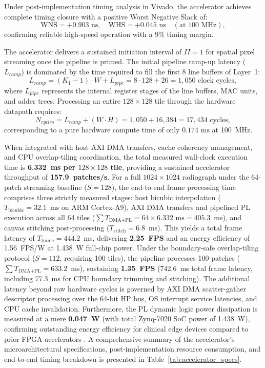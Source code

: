 \documentclass[conference]{IEEEtran}
\begin{document}
Under post-implementation timing analysis in Vivado, the accelerator achieves complete timing closure with a positive Worst Negative Slack of:
\begin{equation}
    \text{WNS} = +0.903\text{ ns}, \quad \text{WHS} = +0.045\text{ ns} \quad (\text{at } 100\text{ MHz}),
    \label{eq:wns}
\end{equation}
confirming reliable high-speed operation with a 9\% timing margin.

The accelerator delivers a sustained initiation interval of $II = 1$ for spatial pixel streaming once the pipeline is primed. The initial pipeline ramp-up latency ($L_{ramp}$) is dominated by the time required to fill the first 8 line buffers of Layer~1:
\begin{equation}
    L_{ramp} = (K_1 - 1) \cdot W + L_{pipe} = 8 \cdot 128 + 26 = 1,050\text{ clock cycles},
    \label{eq:ramp}
\end{equation}
where $L_{pipe}$ represents the internal register stages of the line buffers, MAC units, and adder trees. Processing an entire $128 \times 128$ tile through the hardware datapath requires:
\begin{equation}
    N_{cycles} = L_{ramp} + (W \cdot H) = 1,050 + 16,384 = 17,434\text{ cycles},
    \label{eq:total_cycles}
\end{equation}
corresponding to a pure hardware compute time of only $0.174\text{ ms}$ at 100~MHz. 

When integrated with host AXI DMA transfers, cache coherency management, and CPU overlap-tiling coordination, the total measured wall-clock execution time is \textbf{6.332~ms per $128 \times 128$ tile}, providing a sustained accelerator throughput of \textbf{157.9~patches/s}. For a full $1024 \times 1024$ radiograph under the 64-patch streaming baseline ($S = 128$), the end-to-end frame processing time comprises three strictly measured stages: host bicubic interpolation ($T_{\text{bicubic}} = 32.1$~ms on ARM Cortex-A9), AXI DMA transfers and pipelined PL execution across all 64 tiles ($\sum T_{\text{DMA+PL}} = 64 \times 6.332\text{~ms} = 405.3$~ms), and canvas stitching post-processing ($T_{\text{stitch}} = 6.8$~ms). This yields a total frame latency of $T_{\text{frame}} = 444.2$~ms, delivering \textbf{2.25~FPS} and an energy efficiency of 1.56~FPS/W at 1.438~W full-chip power. Under the boundary-safe overlap-tiling protocol ($S = 112$, requiring 100 tiles), the pipeline processes 100 patches ($\sum T_{\text{DMA+PL}} = 633.2$~ms), sustaining \textbf{1.35~FPS} (742.6~ms total frame latency, including 77.3~ms for CPU boundary trimming and stitching). The additional latency beyond raw hardware cycles is governed by AXI DMA scatter-gather descriptor processing over the 64-bit HP bus, OS interrupt service latencies, and CPU cache invalidation. Furthermore, the PL dynamic logic power dissipation is measured at a mere \textbf{0.047~W} (with total Zynq-7020 SoC power of 1.438~W), confirming outstanding energy efficiency for clinical edge devices compared to prior FPGA accelerators \cite{kim2019real, liu2024high}. A comprehensive summary of the accelerator's microarchitectural specifications, post-implementation resource consumption, and end-to-end timing breakdown is presented in Table~\ref{tab:accelerator_specs}.
\end{document}
